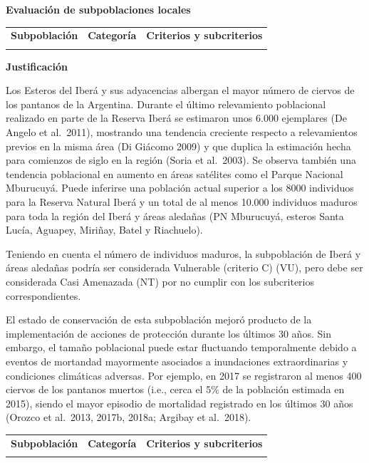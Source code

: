 \documentclass[
  x11names]{article}
\begin{document}
\textbf{Evaluación de subpoblaciones locales}

\begin{tabu} to 
\toprule
\textbf{Subpoblación} & \textbf{Categoría} & \textbf{Criterios y subcriterios}\\
\midrule
{} &  & \\
\bottomrule
\end{tabu}

\textbf{Justificación}

Los Esteros del Iberá y sus adyacencias albergan el mayor número de
ciervos de los pantanos de la Argentina. Durante el último relevamiento
poblacional realizado en parte de la Reserva Iberá se estimaron unos
6.000 ejemplares (De Angelo et al.~2011), mostrando una tendencia
creciente respecto a relevamientos previos en la misma área (Di Giácomo
2009) y que duplica la estimación hecha para comienzos de siglo en la
región (Soria et al.~2003). Se observa también una tendencia poblacional
en aumento en áreas satélites como el Parque Nacional Mburucuyá. Puede
inferirse una población actual superior a los 8000 individuos para la
Reserva Natural Iberá y un total de al menos 10.000 individuos maduros
para toda la región del Iberá y áreas aledañas (PN Mburucuyá, esteros
Santa Lucía, Aguapey, Miriñay, Batel y Riachuelo).

Teniendo en cuenta el número de individuos maduros, la subpoblación de
Iberá y áreas aledañas podría ser considerada Vulnerable (criterio C)
(VU), pero debe ser considerada Casi Amenazada (NT) por no cumplir con
los subcriterios correspondientes.

El estado de conservación de esta subpoblación mejoró producto de la
implementación de acciones de protección durante los últimos 30 años.
Sin embargo, el tamaño poblacional puede estar fluctuando temporalmente
debido a eventos de mortandad mayormente asociados a inundaciones
extraordinarias y condiciones climáticas adversas. Por ejemplo, en 2017
se registraron al menos 400 ciervos de los pantanos muertos (i.e., cerca
el 5\% de la población estimada en 2015), siendo el mayor episodio de
mortalidad registrado en los últimos 30 años (Orozco et al.~2013, 2017b,
2018a; Argibay et al.~2018).\vspace{0.5cm}

\begin{tabu} to 
\toprule
\textbf{Subpoblación} & \textbf{Categoría} & \textbf{Criterios y subcriterios}\\
\midrule
{} &  & \\
\bottomrule
\end{tabu}
\end{document}
